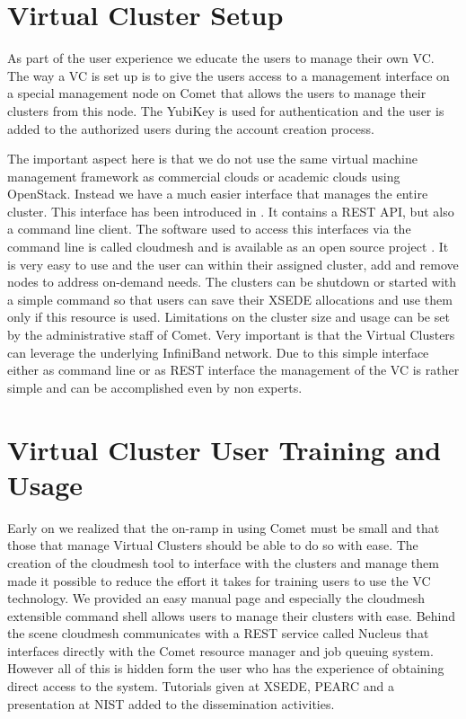 \documentclass[sigconf,hyphens]{acmart}
\begin{document}
\section{Virtual Cluster Setup}\label{sec:setup}

As part of the user experience we educate the users to manage their
own VC. The way a VC is set up is to give the users access to a
management interface on a special management node on Comet that allows
the users to manage their clusters from this node. The YubiKey is used
for authentication and the user is added to the authorized users
during the account creation process.

The important aspect here is that we do not use the same virtual
machine management framework as commercial clouds or academic clouds
using OpenStack. Instead we have a much easier interface that manages
the entire cluster. This interface has been introduced in
\cite{comet-vc}. It contains a REST API, but also a command line
client. The software used to access this interfaces via the command
line is called cloudmesh and is available as an open source project
\cite{cloudmesh-comet-manual}. It is very easy to use and the user can
within their assigned cluster, add and remove nodes to address
on-demand needs. The clusters can be shutdown or started with a simple
command so that users can save their XSEDE allocations and use them
only if this resource is used. Limitations on the cluster size and
usage can be set by the administrative staff of Comet. Very important
is that the Virtual Clusters can leverage the underlying InfiniBand
network. Due to this simple interface either as command line or as
REST interface the management of the VC is rather simple and can be
accomplished even by non experts.

\section{Virtual Cluster User Training and Usage}\label{sec:training}

Early on we realized that the on-ramp in using Comet must be small and
that those that manage Virtual Clusters should be able to do so with
ease. The creation of the cloudmesh tool to interface with the
clusters and manage them made it possible to reduce the effort it
takes for training users to use the VC technology. We provided an easy
manual page and especially the cloudmesh extensible command shell
allows users to manage their clusters with ease. Behind the scene
cloudmesh communicates with a REST service called Nucleus that
interfaces directly with the Comet resource manager and job queuing
system. However all of this is hidden form the user who has the
experience of obtaining direct access to the system. Tutorials given
at XSEDE, PEARC and a presentation at NIST added to the dissemination
activities.
\end{document}
